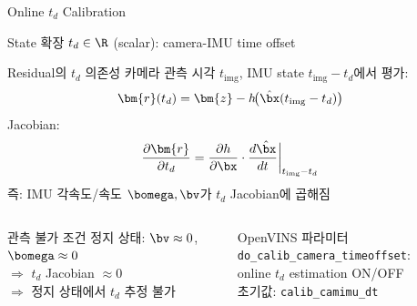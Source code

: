 \begin{frame}[shrink=10]{Online $t_d$ Calibration}
  \begin{block}{State 확장}
    $t_d \in \R$ (scalar): camera-IMU time offset
  \end{block}
  \begin{block}{Residual의 $t_d$ 의존성}
    카메라 관측 시각 $t_{\text{img}}$, IMU state $t_{\text{img}} - t_d$에서 평가:
    \begin{align*}
      \bm{r}(t_d) &= \bm{z} - h\!\bigl(\hat{\bx}(t_{\text{img}} - t_d)\bigr)
    \end{align*}
    Jacobian:
    \begin{align*}
      \frac{\partial \bm{r}}{\partial t_d} &=
      \frac{\partial h}{\partial \bx}\cdot\frac{d\hat{\bx}}{dt}\bigg|_{t_{\text{img}}-t_d}
    \end{align*}
    즉: IMU 각속도/속도 $\bomega, \bv$가 $t_d$ Jacobian에 곱해짐
  \end{block}
  \begin{columns}[T]
      \begin{alertblock}{관측 불가 조건}
        정지 상태: $\bv \approx 0$, $\bomega \approx 0$\\
        $\Rightarrow$ $t_d$ Jacobian $\approx 0$\\
        $\Rightarrow$ 정지 상태에서 $t_d$ 추정 불가
      \end{alertblock}
      \begin{exampleblock}{OpenVINS 파라미터}
        \texttt{do\_calib\_camera\_timeoffset}:\\
        online $t_d$ estimation ON/OFF\\
        초기값: \texttt{calib\_camimu\_dt}
      \end{exampleblock}
  \end{columns}
\end{frame}


